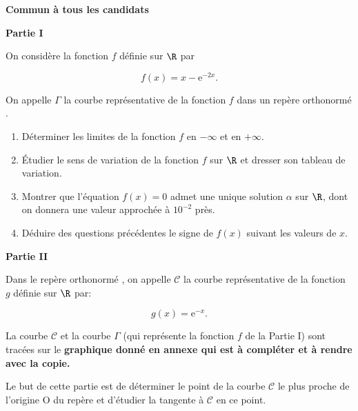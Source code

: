 \textbf{Commun à tous les candidats}

\medskip

\begin{center}\textbf{Partie I}\end{center}

On considère la fonction $f$ définie sur $\R$ par 

\[f(x) = x - \text{e}^{-2x}.\]

On appelle $\Gamma$ la courbe représentative de la fonction $f$ dans un repère orthonormé \Oij.

\medskip

\begin{enumerate}
\item Déterminer les limites de la fonction $f$ en $- \infty$ et en $+ \infty$.
\item Étudier le sens de variation de la fonction $f$ sur $\R$ et dresser son tableau de variation.
\item Montrer que l'équation $f(x) = 0$ admet une unique solution $\alpha$ sur $\R$, dont on donnera une valeur approchée à $10^{-2}$ près.
\item Déduire des questions précédentes le signe de $f(x)$ suivant les valeurs de $x$.
\end{enumerate}

\begin{center}\textbf{Partie II}\end{center}


Dans le repère orthonormé \Oij, on appelle $\mathcal{C}$ la courbe représentative de la fonction $g$ définie sur $\R$ par:

\[g(x) = \text{e}^{-x}.\]

 La courbe $\mathcal{C}$ et la courbe $\Gamma$ (qui représente la fonction $f$ de la Partie I) sont tracées sur le \textbf{graphique donné en annexe qui est à compléter et à rendre avec la copie.}

\smallskip

Le but de cette partie est de déterminer le point de la courbe $\mathcal{C}$ le plus proche de l'origine O du repère et d'étudier la tangente à $\mathcal{C}$ en ce point.

\medskip

